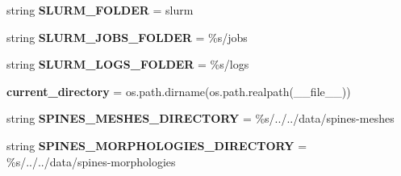 \begin{DoxyCompactItemize}
\item 
string {\bfseries S\+L\+U\+R\+M\+\_\+\+F\+O\+L\+D\+ER} = \textquotesingle{}slurm\textquotesingle{}\hypertarget{classmeshy_1_1neuromorphovis_1_1consts_1_1paths__consts_1_1Paths_ae38a3b7ca94c89af616d5daa1b01ce7f}{}\label{classmeshy_1_1neuromorphovis_1_1consts_1_1paths__consts_1_1Paths_ae38a3b7ca94c89af616d5daa1b01ce7f}

\item 
string {\bfseries S\+L\+U\+R\+M\+\_\+\+J\+O\+B\+S\+\_\+\+F\+O\+L\+D\+ER} = \textquotesingle{}\%s/jobs\textquotesingle{}\hypertarget{classmeshy_1_1neuromorphovis_1_1consts_1_1paths__consts_1_1Paths_aac2f61dfaa89736ab58e6cbf70dd4466}{}\label{classmeshy_1_1neuromorphovis_1_1consts_1_1paths__consts_1_1Paths_aac2f61dfaa89736ab58e6cbf70dd4466}

\item 
string {\bfseries S\+L\+U\+R\+M\+\_\+\+L\+O\+G\+S\+\_\+\+F\+O\+L\+D\+ER} = \textquotesingle{}\%s/logs\textquotesingle{}\hypertarget{classmeshy_1_1neuromorphovis_1_1consts_1_1paths__consts_1_1Paths_a42b69d5718b9380a1fd1822a0d483cfc}{}\label{classmeshy_1_1neuromorphovis_1_1consts_1_1paths__consts_1_1Paths_a42b69d5718b9380a1fd1822a0d483cfc}

\item 
{\bfseries current\+\_\+directory} = os.\+path.\+dirname(os.\+path.\+realpath(\+\_\+\+\_\+file\+\_\+\+\_\+))\hypertarget{classmeshy_1_1neuromorphovis_1_1consts_1_1paths__consts_1_1Paths_ab09c35f2f185485ac49445ee4fbef486}{}\label{classmeshy_1_1neuromorphovis_1_1consts_1_1paths__consts_1_1Paths_ab09c35f2f185485ac49445ee4fbef486}

\item 
string {\bfseries S\+P\+I\+N\+E\+S\+\_\+\+M\+E\+S\+H\+E\+S\+\_\+\+D\+I\+R\+E\+C\+T\+O\+RY} = \textquotesingle{}\%s/../../data/spines-\/meshes\textquotesingle{}\hypertarget{classmeshy_1_1neuromorphovis_1_1consts_1_1paths__consts_1_1Paths_a4ce8f9cb4ef84caeff7c7f0f1306077d}{}\label{classmeshy_1_1neuromorphovis_1_1consts_1_1paths__consts_1_1Paths_a4ce8f9cb4ef84caeff7c7f0f1306077d}

\item 
string {\bfseries S\+P\+I\+N\+E\+S\+\_\+\+M\+O\+R\+P\+H\+O\+L\+O\+G\+I\+E\+S\+\_\+\+D\+I\+R\+E\+C\+T\+O\+RY} = \textquotesingle{}\%s/../../data/spines-\/morphologies\textquotesingle{}\hypertarget{classmeshy_1_1neuromorphovis_1_1consts_1_1paths__consts_1_1Paths_a998c06a2e2779b13752f08441ff7fb03}{}\label{classmeshy_1_1neuromorphovis_1_1consts_1_1paths__consts_1_1Paths_a998c06a2e2779b13752f08441ff7fb03}

\end{DoxyCompactItemize}


